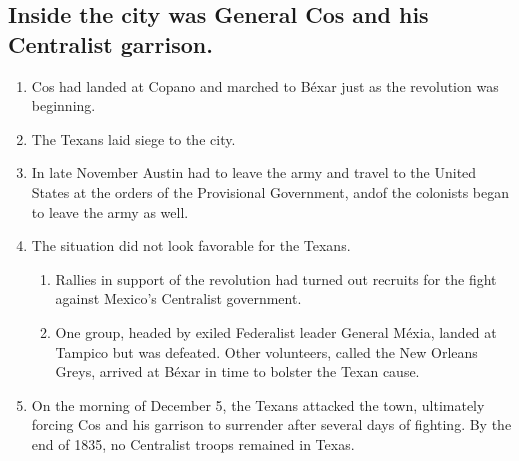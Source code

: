\documentclass{scrartcl}
\begin{document}
\subsection{Inside the city was General Cos and his Centralist garrison.}
\label{sec:orgc0a313a}
\begin{enumerate}
\item Cos had landed at Copano and marched to Béxar just as the revolution was beginning.
\item The Texans laid siege to the city.
\item In late November Austin had to leave the army and travel to the United
States at the orders of the Provisional Government, andof the colonists
began to leave the army as well.
\item The situation did not look favorable for the Texans.
\begin{enumerate}
\item Rallies in support of the revolution had turned out recruits for the
fight against Mexico's Centralist government.
\item One group, headed by exiled Federalist leader General Méxia, landed
at Tampico but was defeated. Other volunteers, called the New
Orleans Greys, arrived at Béxar in time to bolster the Texan cause.
\end{enumerate}
\item On the morning of December 5, the Texans attacked the town, ultimately
forcing Cos and his garrison to surrender after several days of
fighting. By the end of 1835, no Centralist troops remained in Texas.
\end{enumerate}
\end{document}
